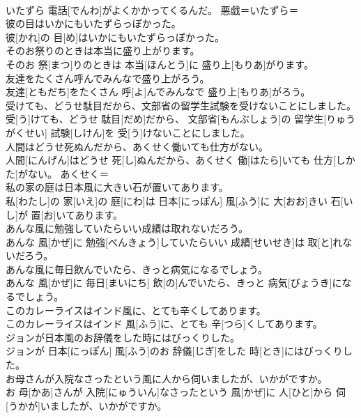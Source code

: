 \documentclass[8pt]{extreport}
\begin{document}
\begin{CJK}{UTF8}{min}
\\	いたずら 電話[でんわ]がよくかかってくるんだ。	悪戯＝いたずら＝ 
\\	彼の目はいかにもいたずらっぽかった。	
\\	彼[かれ]の 目[め]はいかにもいたずらっぽかった。	
\\	そのお祭りのときは本当に盛り上がります。	
\\	そのお 祭[まつ]りのときは 本当[ほんとう]に 盛り上[もりあ]がります。	
\\	友達をたくさん呼んでみんなで盛り上がろう。	
\\	友達[ともだち]をたくさん 呼[よ]んでみんなで 盛り上[もりあ]がろう。	
\\	受けても、どうせ駄目だから、文部省の留学生試験を受けないことにしました。	
\\	受[う]けても、どうせ 駄目[だめ]だから、 文部省[もんぶしょう]の 留学生[りゅうがくせい] 試験[しけん]を 受[う]けないことにしました。	
\\	人間はどうせ死ぬんだから、あくせく働いても仕方がない。	
\\	人間[にんげん]はどうせ 死[し]ぬんだから、あくせく 働[はたら]いても 仕方[しかた]がない。	あくせく＝ 
\\	私の家の庭は日本風に大きい石が置いてあります。	
\\	私[わたし]の 家[いえ]の 庭[にわ]は 日本[にっぽん] 風[ふう]に 大[おお]きい 石[いし]が 置[お]いてあります。	
\\	あんな風に勉強していたらいい成績は取れないだろう。	
\\	あんな 風[かぜ]に 勉強[べんきょう]していたらいい 成績[せいせき]は 取[と]れないだろう。	
\\	あんな風に毎日飲んでいたら、きっと病気になるでしょう。	
\\	あんな 風[かぜ]に 毎日[まいにち] 飲[の]んでいたら、きっと 病気[びょうき]になるでしょう。	
\\	このカレーライスはインド風に、とても辛くしてあります。	
\\	このカレーライスはインド 風[ふう]に、とても 辛[つら]くしてあります。	
\\	ジョンが日本風のお辞儀をした時にはびっくりした。	
\\	ジョンが 日本[にっぽん] 風[ふう]のお 辞儀[じぎ]をした 時[とき]にはびっくりした。	
\\	お母さんが入院なさったという風に人から伺いましたが、いかがですか。	
\\	お 母[かあ]さんが 入院[にゅういん]なさったという 風[かぜ]に 人[ひと]から 伺[うかが]いましたが、いかがですか。	

\end{CJK}
\end{document}
